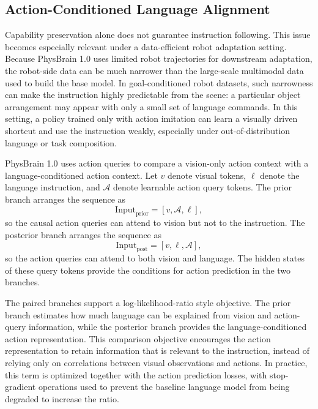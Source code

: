 \subsection{Action-Conditioned Language Alignment}

Capability preservation alone does not guarantee instruction following. This issue becomes especially relevant under a data-efficient robot adaptation setting. Because PhysBrain 1.0 uses limited robot trajectories for downstream adaptation, the robot-side data can be much narrower than the large-scale multimodal data used to build the base model. In goal-conditioned robot datasets, such narrowness can make the instruction highly predictable from the scene: a particular object arrangement may appear with only a small set of language commands. In this setting, a policy trained only with action imitation can learn a visually driven shortcut and use the instruction weakly, especially under out-of-distribution language or task composition.

PhysBrain 1.0 uses action queries to compare a vision-only action context with a language-conditioned action context. Let $v$ denote visual tokens, $\ell$ denote the language instruction, and $\mathcal{A}$ denote learnable action query tokens. The prior branch arranges the sequence as
\begin{equation}
    \mathrm{Input}_{\mathrm{prior}} = [v, \mathcal{A}, \ell],
\end{equation}
so the causal action queries can attend to vision but not to the instruction. The posterior branch arranges the sequence as
\begin{equation}
    \mathrm{Input}_{\mathrm{post}} = [v, \ell, \mathcal{A}],
\end{equation}
so the action queries can attend to both vision and language. The hidden states of these query tokens provide the conditions for action prediction in the two branches.

The paired branches support a log-likelihood-ratio style objective. The prior branch estimates how much language can be explained from vision and action-query information, while the posterior branch provides the language-conditioned action representation. This comparison objective encourages the action representation to retain information that is relevant to the instruction, instead of relying only on correlations between visual observations and actions. In practice, this term is optimized together with the action prediction losses, with stop-gradient operations used to prevent the baseline language model from being degraded to increase the ratio.


